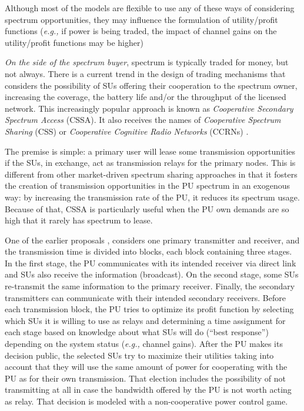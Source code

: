 Although most of the models are flexible to use any of these ways of considering spectrum opportunities, they may influence the formulation of utility/profit functions (\textit{e.g.,} if power is being traded, the impact of channel gains on the utility/profit functions may be higher)

\textit{On the side of the spectrum buyer}, spectrum is typically traded for money, but not always. There is a current trend in the design of trading mechanisms that considers the possibility of SUs offering their cooperation to the spectrum owner, increasing the coverage, the battery life and/or the throughput of the licensed network. This increasingly popular approach is known as \textit{Cooperative Secondary Spectrum Access} (CSSA). It also receives the names of \textit{Cooperative Spectrum Sharing} (CSS) or \textit{Cooperative Cognitive Radio Networks} (CCRNs) \cite{ref:Simeone2008,ref:Zhang2009,ref:Yi2010,ref:Vazquez2010,ref:Li2011,ref:Duan2011_Contract,ref:Duan2014,ref:Yan2013,ref:Feng2014}.

The premise is simple: a primary user will lease some transmission opportunities if the SUs, in exchange, act as transmission relays for the primary nodes. This is different from other market-driven spectrum sharing approaches in that it fosters the creation of transmission opportunities in the PU spectrum in an exogenous way: by increasing the transmission rate of the PU, it reduces its spectrum usage. Because of that, CSSA is particularly useful when the PU own demands are so high that it rarely has spectrum to lease.

One of the earlier proposals \cite{ref:Simeone2008}, considers one primary transmitter and receiver, and the transmission time is divided into blocks, each block containing three stages. In the first stage, the PU communicates with its intended receiver via direct link and SUs also receive the information (broadcast). On the second stage, some SUs re-transmit the same information to the primary receiver. Finally, the secondary transmitters can communicate with their intended secondary receivers. Before each transmission block, the PU tries to optimize its profit function by selecting which SUs it is willing to use as relays and determining a time assignment for each stage based on knowledge about what SUs will do (``best response'') depending on the system status (\textit{e.g.,} channel gains). After the PU makes its decision public, the selected SUs try to maximize their utilities taking into account that they will use the same amount of power for cooperating with the PU as for their own transmission. That election includes the possibility of not transmitting at all in case the bandwidth offered by the PU is not worth acting as relay. That decision is modeled with a non-cooperative power control game.

